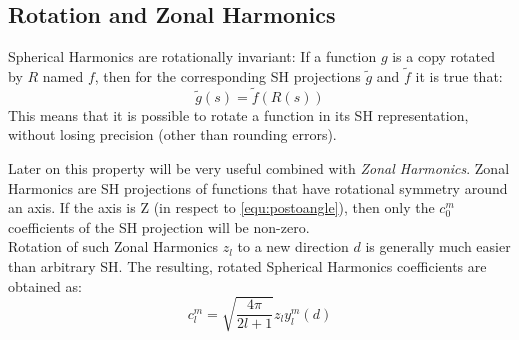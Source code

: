 \documentclass[thesis.tex]{subfiles}
\begin{document}
\subsection{Rotation and Zonal Harmonics} \label{sec:pre:zonalharmonics}
Spherical Harmonics are rotationally invariant:
If a function $g$ is a copy rotated by $R$ named $f$, then for the corresponding SH projections $\widetilde{g}$ and $\widetilde{f}$ it is true that:
\begin{equation}
	\widetilde{g}(s) = \widetilde{f}(R(s))
\end{equation}
This means that it is possible to rotate a function in its SH representation, without losing precision (other than rounding errors).

Later on this property will be very useful combined with \emph{Zonal Harmonics}.
Zonal Harmonics are SH projections of functions that have rotational symmetry around an axis.
If the axis is Z (in respect to \autoref{equ:postoangle}), then only the $c^m_0$ coefficients of the SH projection will be non-zero.\\
Rotation of such Zonal Harmonics $z_l$ to a new direction $d$ is generally much easier than arbitrary SH.
The resulting, rotated Spherical Harmonics coefficients are obtained as:
\begin{equation} \label{eq:zonalrotate}
	c_l^m = \sqrt{\frac{4\pi}{2l+1}} z_l y_l^m(d)
\end{equation}

\subfilebib %
\end{document}
